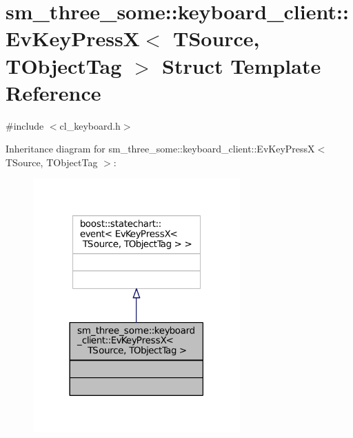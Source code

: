 \hypertarget{structsm__three__some_1_1keyboard__client_1_1EvKeyPressX}{}\section{sm\+\_\+three\+\_\+some\+:\+:keyboard\+\_\+client\+:\+:Ev\+Key\+PressX$<$ T\+Source, T\+Object\+Tag $>$ Struct Template Reference}
\label{structsm__three__some_1_1keyboard__client_1_1EvKeyPressX}


{\ttfamily \#include $<$cl\+\_\+keyboard.\+h$>$}



Inheritance diagram for sm\+\_\+three\+\_\+some\+:\+:keyboard\+\_\+client\+:\+:Ev\+Key\+PressX$<$ T\+Source, T\+Object\+Tag $>$\+:
\nopagebreak
\begin{figure}[H]
\begin{center}
\leavevmode
\includegraphics[width=225pt]{structsm__three__some_1_1keyboard__client_1_1EvKeyPressX__inherit__graph}
\end{center}
\end{figure}


